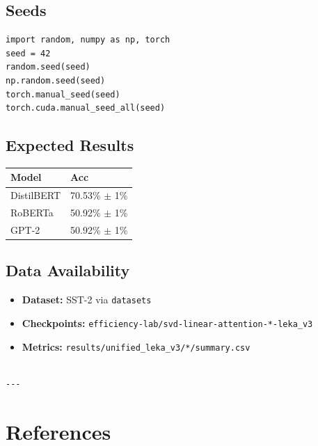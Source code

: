 \subsection{Seeds}

\begin{lstlisting}
import random, numpy as np, torch
seed = 42
random.seed(seed)
np.random.seed(seed)
torch.manual_seed(seed)
torch.cuda.manual_seed_all(seed)
\end{lstlisting}

\subsection{Expected Results}

\begin{table}[H]
\centering
\small
\begin{tabular}{ll}
\toprule
\textbf{Model} & \textbf{Acc} \\
\midrule
DistilBERT & 70.53\% $\pm$ 1\% \\
RoBERTa & 50.92\% $\pm$ 1\% \\
GPT-2 & 50.92\% $\pm$ 1\% \\
\bottomrule
\end{tabular}
\end{table}

\subsection{Data Availability}

\begin{itemize}
\item \textbf{Dataset:} SST-2 via \texttt{datasets}
\item \textbf{Checkpoints:} \texttt{efficiency-lab/svd-linear-attention-*-leka\_v3}
\item \textbf{Metrics:} \texttt{results/unified\_leka\_v3/*/summary.csv}
\end{itemize}
\begin{lstlisting}

---
\end{lstlisting}

\section{References}

